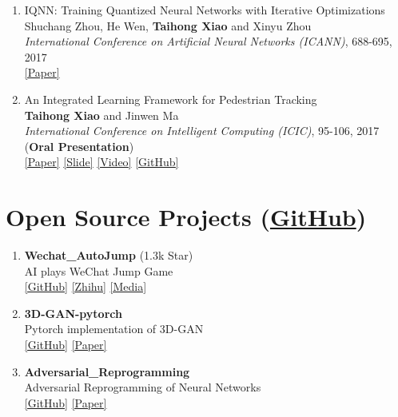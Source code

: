\documentclass[letterpaper]{article}
\begin{document}
\begin{enumerate}
\item IQNN: Training Quantized Neural Networks with Iterative Optimizations\\
	Shuchang Zhou, He Wen, {\bf Taihong Xiao} and Xinyu Zhou\\
	{\it International Conference on Artificial Neural Networks (ICANN)},  688-695, 2017\\
	\href{https://link.springer.com/chapter/10.1007\%2F978-3-319-68612-7_78}{[Paper]} 

\item An Integrated Learning Framework for Pedestrian Tracking\\
	{\bf Taihong Xiao} and Jinwen Ma\\
	{\it International Conference on Intelligent Computing (ICIC)}, 95-106, 2017 ({\bf Oral Presentation})\\
	\href{https://link.springer.com/chapter/10.1007\%2F978-3-319-63315-2_9}{[Paper]}
	\href{https://prinsphield.github.io/extra/ICIC-20170808.pdf}{[Slide]}
	\href{https://youtu.be/HQIi0Z9b4Pw}{[Video]}
	\href{https://github.com/Prinsphield/ILFPT}{[GitHub]}

\end{enumerate}



\section*{Open Source Projects (\href{https://github.com/Prinsphield}{GitHub})}

\begin{enumerate}

\item {\bf Wechat\_AutoJump} (1.3k Star)\\
	AI plays WeChat Jump Game \\
	\href{https://github.com/Prinsphield/Wechat_AutoJump}{[GitHub]}
	\href{https://zhuanlan.zhihu.com/p/32636329}{[Zhihu]}
	\href{https://www.jiqizhixin.com/articles/2018-01-06-9}{[Media]}

\item {\bf 3D-GAN-pytorch}\\
	Pytorch implementation of 3D-GAN \\
	\href{https://github.com/Prinsphield/Wechat_AutoJump}{[GitHub]}
	\href{http://3dgan.csail.mit.edu/papers/3dgan_nips.pdf}{[Paper]}

\item {\bf Adversarial\_Reprogramming}\\
	Adversarial Reprogramming of Neural Networks \\
	\href{https://github.com/Prinsphield/Adversarial_Reprogramming}{[GitHub]}
	\href{https://arxiv.org/abs/1806.11146}{[Paper]}

\end{enumerate}
\end{document}
